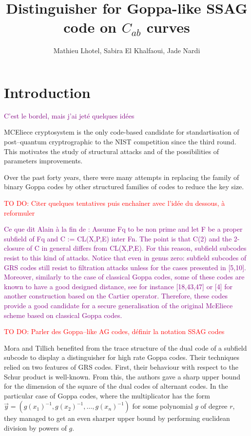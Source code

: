 \documentclass[a4paper]{article}
\title{Distinguisher for Goppa-like SSAG code on $C_{ab}$ curves}
\author{Mathieu Lhotel, Sabira El Khalfaoui, Jade Nardi}
\date{}
\theoremstyle{definition}
\theoremstyle{remark}
\newcommand\jade[1]{\textcolor{purple}{#1}}
\newcommand\TODO[1]{\textcolor{red}{TO DO: #1}}
\begin{document}
\parindent=0pt %

\maketitle

\section{Introduction}

\jade{C'est le bordel, mais j'ai jeté quelques idées}


MCEliece cryptosystem is the only code-based candidate for standartisation of post--quantum cryptrographic to the NIST competition since the third round. This motivates the study of structural attacks and of the possibilities of parameters improvements. 

Over the past forty years, there were many attempts in replacing the family of binary Goppa codes by other structured families of codes to reduce the key size.

\TODO{Citer quelques tentatives puis enchaîner avec l'idée du dessous, à reformuler}

\jade{Ce que dit Alain à la fin de \cite{CMR17} :
Assume Fq to be non prime and let F be a proper subfield of Fq and C := CL(X,P,E) inter Fn. The point is that C(2) and the 2-closure of C in general differs from CL(X,P,E). For this reason, subfield subcodes resist to this kind of attacks. Notice that even
in genus zero: subfield subcodes of GRS codes still resist to filtration attacks unless for the cases presented in [5,10]. Moreover, similarly to the case of classical Goppa codes, some of these codes are known to have a good designed distance, see for instance [18,43,47] or [4] for another construction based on the Cartier operator. Therefore, these codes provide a good candidate for a secure generalisation of the original McEliece scheme based on classical Goppa codes.}

\TODO{Parler des Goppa--like AG codes, définir la notation SSAG codes}


Mora and Tillich \cite{MT21} benefited from the trace structure of the dual code of a subfield subcode to display a distinguisher for high rate Goppa codes. Their techniques relied on two features of GRS codes. First, their behaviour with respect to the Schur product is well-known. From this, the authors gave a sharp upper bound for the dimension of the square of the dual codes of alternant codes. In the particular case of Goppa codes, where the multiplicator has the form $\vec{y}=(g(x_1)^{-1},g(x_2)^{-1},\dots,g(x_n)^{-1})$ for some polynomial $g$ of degree $r$, they managed to get an even sharper upper bound by performing euclidean division by powers of $g$.
\end{document}
